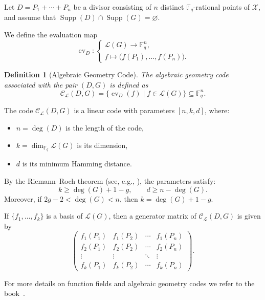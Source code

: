\documentclass[sn-mathphys-num]{sn-jnl_modified}
\newtheorem{definition}[theorem]{Definition}
\begin{document}
Let $D = P_1 + \cdots + P_n$ be a divisor consisting of $n$ distinct $\mathbb{F}_{q}$-rational points of $\mathcal{X}$, and assume that $\operatorname{Supp}(D) \cap \operatorname{Supp}(G) = \varnothing$.

We define the evaluation map
\[
\operatorname{ev}_D :
\begin{cases}
\mathscr{L}(G) \longrightarrow \mathbb{F}_{q}^n, \\
f \longmapsto \bigl(f(P_1), \dots, f(P_n)\bigr).
\end{cases}
\]

\begin{definition}[Algebraic Geometry Code]
The \emph{algebraic geometry code} associated with the pair $(D,G)$ is defined as
\[
\mathcal{C}_{\mathscr{L}}(D,G)
=
\{ \operatorname{ev}_D(f) \mid f \in \mathscr{L}(G) \}
\subseteq \mathbb{F}_{q}^n.
\]
\end{definition}

The code $\mathcal{C}_{\mathscr{L}}(D,G)$ is a linear code with parameters $[n,k,d]$, where:
\begin{itemize}
    \item $n = \deg(D)$ is the length of the code,
    \item $k = \dim_{\mathbb{F}_{q}} \mathscr{L}(G)$ is its dimension,
    \item $d$ is its minimum Hamming distance.
\end{itemize}

By the Riemann–Roch theorem (see, e.g., \cite[Theorem 2.2.2]{Stichtenoth09}), the parameters satisfy:
\[
k \geq \deg(G) + 1 - g,
\qquad
d \geq n - \deg(G).
\]
Moreover, if $2g - 2 < \deg(G) < n$, then $k = \deg(G) + 1 - g$.


If $\{f_1, \ldots, f_k\}$ is a basis of $\mathscr{L}(G)$, then a generator matrix of $\mathcal{C}_{\mathscr{L}}(D,G)$ is given by
\[
\begin{pmatrix}
f_1(P_1) & f_1(P_2) & \cdots & f_1(P_n) \\
f_2(P_1) & f_2(P_2) & \cdots & f_2(P_n) \\
\vdots & \vdots & \ddots & \vdots \\
f_k(P_1) & f_k(P_2) & \cdots & f_k(P_n)
\end{pmatrix}.
\]


For more details on function fields and algebraic geometry codes we refer to the book~\cite{Stichtenoth09}.
\end{document}

